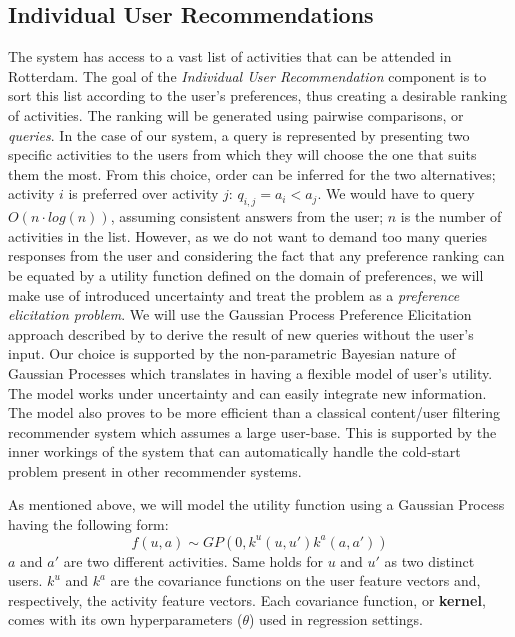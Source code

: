 \documentclass[11pt,a4paper,oneside]{article}
\begin{document}
\subsection{Individual User Recommendations}
The system has access to a vast list of activities that can be attended in Rotterdam. The goal of the \emph{Individual User Recommendation} component is to sort this list according to the user's preferences, thus creating a desirable ranking of activities. The ranking will be generated using pairwise comparisons, or \emph{queries}. In the case of our system, a query is represented by presenting two specific activities to the users from which they will choose the one that suits them the most. From this choice, order can be inferred for the two alternatives; activity $i$ is preferred over activity $j$: $q_{i,j} = a_i < a_j$.  We would have to query $O(n\cdot log(n))$, assuming consistent answers from the user; $n$ is the number of activities in the list. However, as we do not want to demand too many queries responses from the user and considering the fact that any preference ranking can be equated by a utility function defined on the domain of preferences, we will make use of introduced uncertainty and treat the problem as a \emph{preference elicitation problem}. We will use the Gaussian Process Preference Elicitation approach described by \citeauthor{guo_GaussianProcessPreference_2010} \cite{guo_GaussianProcessPreference_2010} to derive the result of new queries without the user's input. Our choice is supported by the non-parametric Bayesian nature of Gaussian Processes which translates in having a flexible model of user's utility. The model works under uncertainty and can easily integrate new information. The model also proves to be more efficient than a classical content/user filtering recommender system which assumes a large user-base. This is supported by the inner workings of the system that can automatically handle the cold-start problem present in other recommender systems.

As mentioned above, we will model the utility function using a Gaussian Process having the following form:
\begin{equation}
    \label{gp}
    f(u, a) \sim GP(0, k^u(u,u')k^a(a, a'))
\end{equation}
$a$ and $a'$ are two different activities. Same holds for $u$ and $u'$ as two distinct users. $k^u$ and $k^a$ are the covariance functions on the user feature vectors and, respectively, the activity feature vectors. Each covariance function, or \textbf{kernel}, comes with its own hyperparameters ($\theta$) used in regression settings.
\end{document}
